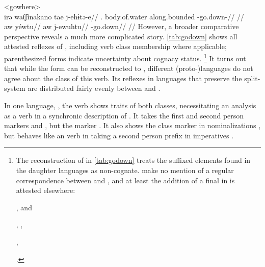 \pex<gowhere>
 \carijo {}\\
\begingl
\gla irə wat͡ʃinakano tae j-ehɨtə-e//
\glb {}. body.of.water along.bounded -go.down-//
\glft {}//
\endgl
{} \yukpa \parencite[][]{meira2003primeras}\\
\begingl
\glpreamble aw yéwtu//
\gla aw j-ewuhtu//
\glb {} -go.down//
\glft {}//
\endgl
\xe
%
However, a broader comparative perspective reveals a much more complicated story.
\cref{tab:godown} shows all attested reflexes of , including verb class membership where applicable; parenthesized forms indicate uncertainty about cognacy status.%
\footnote{The reconstruction of \PPek {} in \cref{tab:godown} treats the suffixed elements found in the daughter languages as non-cognate.
\textcite{meira2005southern} make no mention of a regular correspondence between \bakairi {} and \ikpeng {}, and at least the addition of a final  in \PXin is attested elsewhere:
		\begin{inlinelist}
			\item \PC {} , \arara and \ikpeng {} %
			\item \PC {} , \arara {}, \ikpeng {} %
			\item \PC {} , \arara {}  %
		\end{inlinelist} \parencites[8]{gildea2007greenberg}[56, 144, 57]{alves2017arara}[25, 270]{ikpengpacheco2001}.}
It turns out that while the form  can be reconstructed to \PC, different (proto-)languages do not agree about the class of this verb.
Its reflexes in languages that preserve the split- system are distributed fairly evenly between  and .



In one language, \wayana, the verb shows traits of both classes, necessitating an analysis as a  verb in a synchronic description of \wayana.
It takes the first and second person  markers  and  \parencite[200]{wayanatavares2005}, but the  marker  \parencite[206]{wayanatavares2005}.
It also shows the  class marker  in nominalizations , but behaves like an  verb in taking a second person prefix in imperatives .

